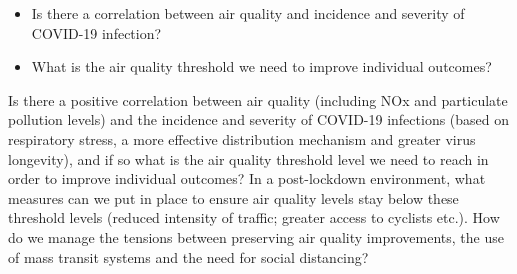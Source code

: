 \begin{itemize}
\item Is there a correlation between air quality and incidence and severity of COVID-19 infection?
\item What is the air quality threshold we need to improve individual outcomes?
\end{itemize}
Is there a positive correlation between air quality (including NOx and particulate pollution levels) and the incidence and severity of COVID-19 infections (based on respiratory stress, a more effective distribution mechanism and greater virus longevity), and if so what is the air quality threshold level we need to reach in order to improve individual outcomes? In a post-lockdown environment, what measures can we put in place to ensure air quality levels stay below these threshold levels (reduced intensity of traffic; greater access to cyclists etc.). How do we manage the tensions between preserving air quality improvements, the use of mass transit systems and the need for social distancing? 